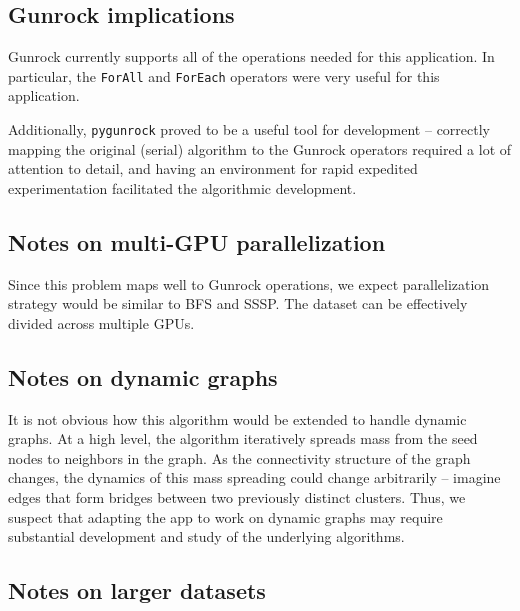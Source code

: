 \documentclass[10pt,oneside]{memoir}
\begin{document}
\hypertarget{gunrock-implications-4}{%
\subsection{Gunrock implications}\label{gunrock-implications-4}}

Gunrock currently supports all of the operations needed for this
application. In particular, the \texttt{ForAll} and \texttt{ForEach}
operators were very useful for this application.

Additionally, \texttt{pygunrock} proved to be a useful tool for
development -- correctly mapping the original (serial) algorithm to the
Gunrock operators required a lot of attention to detail, and having an
environment for rapid expedited experimentation facilitated the
algorithmic development.

\hypertarget{notes-on-multi-gpu-parallelization-5}{%
\subsection{Notes on multi-GPU
parallelization}\label{notes-on-multi-gpu-parallelization-5}}

Since this problem maps well to Gunrock operations, we expect
parallelization strategy would be similar to BFS and SSSP. The dataset
can be effectively divided across multiple GPUs.

\hypertarget{notes-on-dynamic-graphs-5}{%
\subsection{Notes on dynamic graphs}\label{notes-on-dynamic-graphs-5}}

It is not obvious how this algorithm would be extended to handle dynamic
graphs. At a high level, the algorithm iteratively spreads mass from the
seed nodes to neighbors in the graph. As the connectivity structure of
the graph changes, the dynamics of this mass spreading could change
arbitrarily -- imagine edges that form bridges between two previously
distinct clusters. Thus, we suspect that adapting the app to work on
dynamic graphs may require substantial development and study of the
underlying algorithms.

\hypertarget{notes-on-larger-datasets-5}{%
\subsection{Notes on larger datasets}\label{notes-on-larger-datasets-5}}
\end{document}
